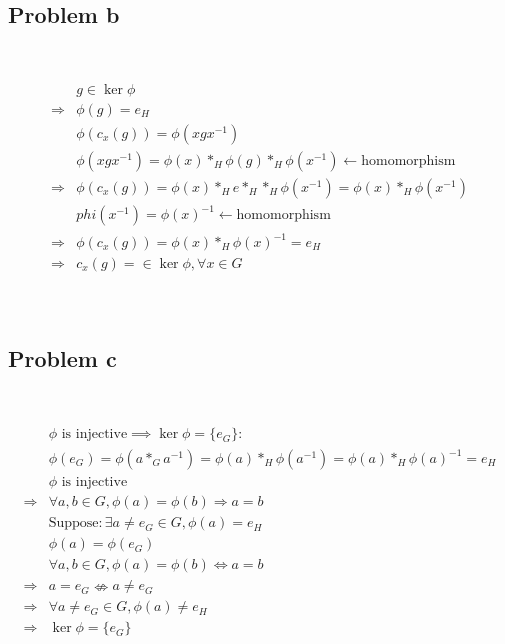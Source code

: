 \documentclass{article}
\begin{document}
\subsection*{Problem b}

~

\begin{equation*}
    \begin{split}
        &g\in\ker\phi\\
        \Rightarrow&\phi(g)=e_H\\
        &\phi(c_x(g))=\phi(xgx^{-1})\\
        &\phi(xgx^{-1})=\phi(x)*_H\phi(g)*_H\phi(x^{-1})\leftarrow\text{homomorphism}\\
        \Rightarrow&\phi(c_x(g))=\phi(x)*_He*_H*_H\phi(x^{-1})=\phi(x)*_H\phi(x^{-1})\\
        &phi(x^{-1})=\phi(x)^{-1}\leftarrow\text{homomorphism}\\
        \Rightarrow&\phi(c_x(g))=\phi(x)*_H\phi(x)^{-1}=e_H\\
        \Rightarrow&c_x(g)=\in\ker\phi,\forall x\in G\\
    \end{split}
\end{equation*}

~

\subsection*{Problem c}

~

\begin{equation*}
    \begin{split}
        &\phi\text{ is injective}\implies \ker\phi=\{e_G\}:\\
        &\phi(e_G)=\phi(a*_Ga^{-1})=\phi(a)*_H\phi(a^{-1})=\phi(a)*_H\phi(a)^{-1}=e_H\\
        &\phi\text{ is injective}\\
        \Rightarrow&\forall a,b\in G, \phi(a)=\phi(b)\Rightarrow a=b\\
        &\text{Suppose}:\exists a\ne e_G\in G,\phi(a)=e_H\\
        &\phi(a)=\phi(e_G)\\
        &\forall a,b\in G, \phi(a)=\phi(b)\Leftrightarrow a=b\\
        \Rightarrow& a=e_G\nLeftrightarrow a\ne e_G\\
        \Rightarrow&\forall a\ne e_G\in G,\phi(a)\ne e_H\\
        \Rightarrow&\ker\phi=\{e_G\}\\
    \end{split}
\end{equation*}
\end{document}
